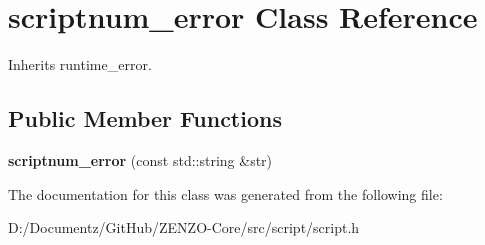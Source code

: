\hypertarget{classscriptnum__error}{}\section{scriptnum\+\_\+error Class Reference}
\label{classscriptnum__error}


Inherits runtime\+\_\+error.

\subsection*{Public Member Functions}
\begin{DoxyCompactItemize}
\item 
\mbox{\label{classscriptnum__error_ae7542abbcec27eb624e8eb8ebefd3d8e}} 
{\bfseries scriptnum\+\_\+error} (const std\+::string \&str)
\end{DoxyCompactItemize}


The documentation for this class was generated from the following file\+:\begin{DoxyCompactItemize}
\item 
D\+:/\+Documentz/\+Git\+Hub/\+Z\+E\+N\+Z\+O-\/\+Core/src/script/script.\+h\end{DoxyCompactItemize}
